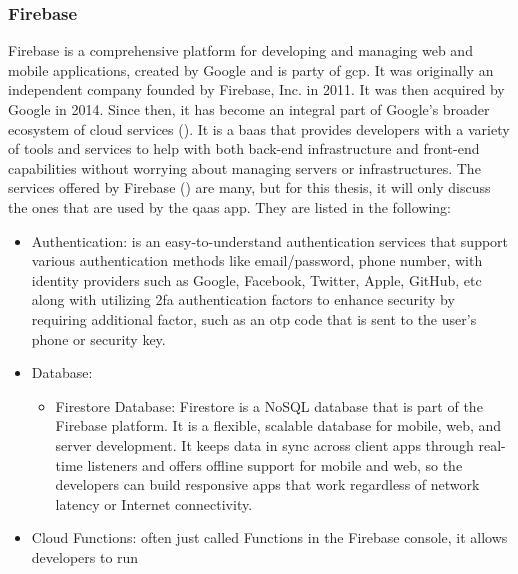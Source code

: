 \begin{multicols}{2}
      \subsubsection{Firebase}
      Firebase is a comprehensive platform for developing and managing web and mobile applications, created by
      Google and is party of \acrshort{gcp}. It was originally an independent company founded by Firebase, Inc.
      in 2011. It was then acquired by Google in 2014. Since then, it has become an integral part of Google's
      broader ecosystem of cloud services (\cite{firebase}). It is a \acrshort{baas} that provides developers with a
      variety of tools and services to help with both back-end infrastructure and front-end capabilities without worrying
      about managing servers or infrastructures. The services offered by Firebase (\textit{\cite{firebaseproducts}}) are
      many, but for this thesis, it will only discuss the ones that are used by the \acrshort{qaas} app. They are listed
      in the following:
      \begin{itemize}
            \item Authentication: is an easy-to-understand authentication services that support various authentication
                  methods like email/password, phone number, with identity providers such as Google, Facebook, Twitter,
                  Apple, GitHub, \acrshort{etc}
                  along with utilizing \acrshort{2fa} authentication factors to enhance security by requiring additional
                  factor, such as an \acrshort{otp} code that is sent to the user's phone or security key.
            \item Database:
                  \begin{itemize}
                        \item Firestore Database: Firestore is a \gls{NoSQL} database that is part of the Firebase
                              platform. It is a flexible, scalable database for mobile, web, and server development. It keeps
                              data in sync across client apps through real-time listeners and offers offline support for mobile
                              and web, so the developers can build responsive apps that work regardless of network latency or
                              Internet connectivity.
                  \end{itemize}
            \item Cloud Functions: often just called Functions in the Firebase console, it allows developers to run

\end{itemize}
\end{multicols}
